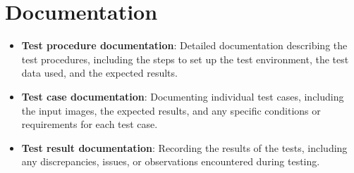 \section{Documentation}
\begin{itemize}
	\item \textbf{Test procedure documentation}: Detailed documentation describing the test procedures, including the steps to set up the test environment, the test data used, and the expected results.
	\item \textbf {Test case documentation}: Documenting individual test cases, including the input images, the expected results, and any specific conditions or requirements for each test case.
	\item \textbf {Test result documentation}: Recording the results of the tests, including any discrepancies, issues, or observations encountered during testing.
\end{itemize}









